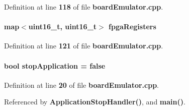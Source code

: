 Definition at line {\bf 118} of file {\bf board\+Emulator.\+cpp}.

\paragraph[{fpga\+Registers}]{\setlength{\rightskip}{0pt plus 5cm}map$<$uint16\+\_\+t, uint16\+\_\+t$>$ fpga\+Registers}\label{boardEmulator_8cpp_a92e9e07e444a95ef5d49ffc694a02969}


Definition at line {\bf 121} of file {\bf board\+Emulator.\+cpp}.

\paragraph[{stop\+Application}]{\setlength{\rightskip}{0pt plus 5cm}bool stop\+Application = false}\label{boardEmulator_8cpp_a2edad80191396287a766547eae09e8aa}


Definition at line {\bf 20} of file {\bf board\+Emulator.\+cpp}.



Referenced by {\bf Application\+Stop\+Handler()}, and {\bf main()}.

